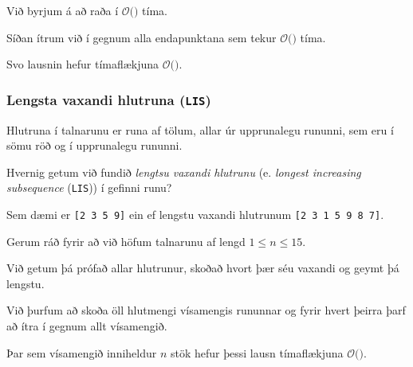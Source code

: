 {
	\only<all:1>{\lineAA}
	\only<all:2>{\lineAB}
	\only<all:3>{\lineAC}
	\only<all:4>{\lineAD}
	\only<all:5>{\lineAE}
	\only<all:6>{\lineAF}
	\only<all:7>{\lineAG}
	\only<all:8>{\lineAH}
	\only<all:9>{\lineAI}
	\only<all:10>{\lineAJ}
	\only<all:11>{\lineAK}
	\only<all:12>{\lineAL}
	\only<all:13>{\lineAM}
	\only<all:14>{\lineAN}
	\only<all:15>{\lineAO}
	\only<all:16>{\lineAP}
	\only<all:17>{\lineAQ}
	\only<all:18>{\lineAR}
	\only<all:19>{\lineAS}
	\only<all:20>{\lineAU}
	\only<all:21>{\lineAV}
	\only<all:22>{\lineAW}
	\only<all:23>{\lineAX}
	\only<all:24>{\lineAY}
	\only<all:25>{\lineAZ}
	\only<all:26>{\lineBA}
	\only<all:27>{\lineBB}
	\only<all:28>{\lineBC}
	\only<all:29>{\lineBD}
	\only<all:30>{\lineBDD}
	\only<all:31>{\lineBE}
	\only<all:32>{\lineBF}
	\only<all:33>{\lineBG}
	\only<all:34>{\lineBH}
	\only<all:35>{\lineBI}
	\only<all:36>{\lineBJ}
	\only<all:37>{\lineBK}
	\only<all:38>{\lineBL}
}

{
}

{
	{
		\item<1-> Við byrjum á að raða í $\mathcal{O}($$)$ tíma.
		\item<3-> Síðan ítrum við í gegnum alla endapunktana sem tekur $\mathcal{O}($$)$ tíma.
		\item<5-> Svo lausnin hefur tímaflækjuna $\mathcal{O}($\onslide<6->{$n \log n$}$)$.
	}
}

{
	\frametitle{Lengsta vaxandi hlutruna (\texttt{LIS})}
	{
		\item<1-> Hlutruna í talnarunu er runa af tölum, allar úr upprunalegu rununni, sem eru í sömu röð og í upprunalegu rununni.
		\item<2-> Hvernig getum við fundið \emph{lengtsu vaxandi hlutrunu} (e. \emph{longest increasing subsequence} (\texttt{LIS})) í gefinni runu?
		\item<3-> Sem dæmi er \texttt{[2 3 5 9]} ein ef lengstu vaxandi hlutrunum \texttt{[2 3 1 5 9 8 7]}.
	}
}

{
	{
		\item<1-> Gerum ráð fyrir að við höfum talnarunu af lengd $1 \leq n \leq 15$.
		\item<2-> Við getum þá prófað allar hlutrunur, skoðað hvort þær séu vaxandi og geymt þá lengstu.
	}
}

{
}

{
	{
		\item<1-> Við þurfum að skoða öll hlutmengi vísamengis rununnar og fyrir hvert þeirra þarf að ítra í gegnum allt vísamengið.
		\item<2-> Þar sem vísamengið inniheldur $n$ stök hefur þessi lausn tímaflækjuna $\mathcal{O}($\onslide<3->{$n \cdot 2^n$}$)$.
	}
}

